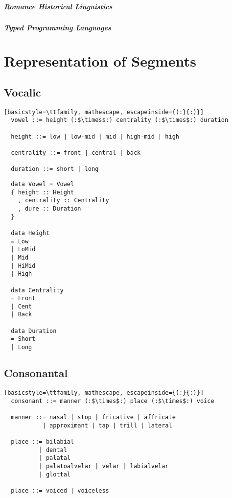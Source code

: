 \documentclass{report}
\begin{document}
\paragraph{Romance Historical Linguistics}

\paragraph{Typed Programming Languages}

\chapter{Representation of Segments}

\section{Vocalic}

\begin{lstlisting}[basicstyle=\ttfamily, mathescape, escapeinside={(:}{:)}]
  vowel ::= height (:$\times$:) centrality (:$\times$:) duration

  height ::= low | low-mid | mid | high-mid | high

  centrality ::= front | central | back

  duration ::= short | long
\end{lstlisting}

\begin{verbatim}
  data Vowel = Vowel
  { height :: Height
    , centrality :: Centrality
    , dure :: Duration
  }

  data Height
  = Low
  | LoMid
  | Mid
  | HiMid
  | High

  data Centrality
  = Front
  | Cent
  | Back

  data Duration
  = Short
  | Long
\end{verbatim}

\section{Consonantal}

\begin{lstlisting}[basicstyle=\ttfamily, mathescape, escapeinside={(:}{:)}]
  consonant ::= manner (:$\times$:) place (:$\times$:) voice

  manner ::= nasal | stop | fricative | affricate
           | approximant | tap | trill | lateral

  place ::= bilabial
          | dental
          | palatal
          | palatoalvelar | velar | labialvelar
          | glottal

  place ::= voiced | voiceless
\end{lstlisting}
\end{document}
